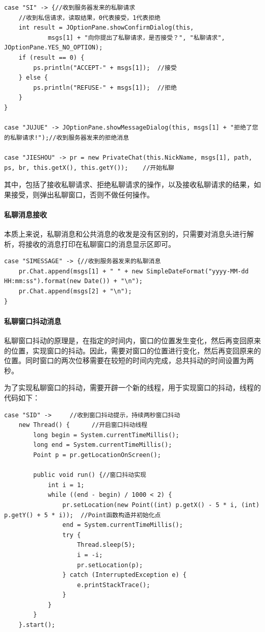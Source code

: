 \documentclass[UTF8,12pt]{article}
\begin{document}
\begin{lstlisting}[title=接收私聊请求,frame=shadowbox]
    case "SI" -> {//收到服务器发来的私聊请求
    //收到私信请求，读取结果，0代表接受，1代表拒绝
    int result = JOptionPane.showConfirmDialog(this,
            msgs[1] + "向你提出了私聊请求，是否接受？", "私聊请求", JOptionPane.YES_NO_OPTION);
    if (result == 0) {
        ps.println("ACCEPT-" + msgs[1]);  //接受
    } else {
        ps.println("REFUSE-" + msgs[1]);  //拒绝
    }
}

case "JUJUE" -> JOptionPane.showMessageDialog(this, msgs[1] + "拒绝了您的私聊请求!");//收到服务器发来的拒绝消息

case "JIESHOU" -> pr = new PrivateChat(this.NickName, msgs[1], path, ps, br, this.getX(), this.getY());    //开始私聊
\end{lstlisting}

其中，包括了接收私聊请求、拒绝私聊请求的操作，以及接收私聊请求的结果，如果接受，则弹出私聊窗口，否则不做任何操作。

\paragraph{私聊消息接收}
本质上来说，私聊消息和公共消息的收发是没有区别的，只需要对消息头进行解析，将接收的消息打印在私聊窗口的消息显示区即可。
    
\begin{lstlisting}[title=私聊消息接收,frame=shadowbox]
    case "SIMESSAGE" -> {//收到服务器发来的私聊消息
    pr.Chat.append(msgs[1] + " " + new SimpleDateFormat("yyyy-MM-dd HH:mm:ss").format(new Date()) + "\n");
    pr.Chat.append(msgs[2] + "\n");
}
\end{lstlisting}

\paragraph{私聊窗口抖动消息}
私聊窗口抖动的原理是，在指定的时间内，窗口的位置发生变化，然后再变回原来的位置，实现窗口的抖动。因此，需要对窗口的位置进行变化，然后再变回原来的位置。同时窗口的两次位移需要在较短的时间内完成，总共抖动的时间设置为两秒。

为了实现私聊窗口的抖动，需要开辟一个新的线程，用于实现窗口的抖动，线程的代码如下：

\begin{lstlisting}[title=私聊窗口抖动,frame=shadowbox]
    case "SID" ->     //收到窗口抖动提示，持续两秒窗口抖动
    new Thread() {      //开启窗口抖动线程
        long begin = System.currentTimeMillis();
        long end = System.currentTimeMillis();
        Point p = pr.getLocationOnScreen();

        public void run() {//窗口抖动实现
            int i = 1;
            while ((end - begin) / 1000 < 2) {
                pr.setLocation(new Point((int) p.getX() - 5 * i, (int) p.getY() + 5 * i));  //Point函数构造并初始化点
                end = System.currentTimeMillis();
                try {
                    Thread.sleep(5);
                    i = -i;
                    pr.setLocation(p);
                } catch (InterruptedException e) {
                    e.printStackTrace();
                }
            }
        }
    }.start();
\end{lstlisting}
\end{document}
